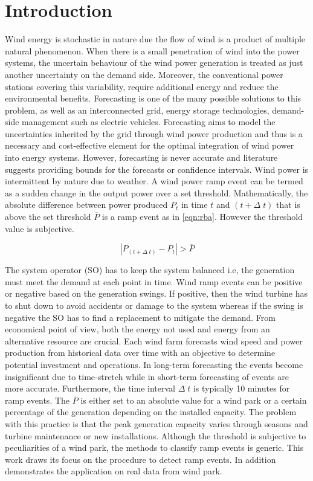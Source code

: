 \section{Introduction} \label{sec:intro}

Wind energy is stochastic in nature due the flow of wind is a product of multiple natural phenomenon. 
When there is a small penetration of wind into the power systems, the uncertain behaviour of the wind power generation is treated as just another uncertainty on the demand side. Moreover, the conventional power stations covering this variability, require additional energy and reduce the environmental benefits. Forecasting is one of the many possible solutions to this problem, as well as an interconnected grid, energy storage technologies, demand-side management such as electric vehicles. Forecasting aims to model the uncertainties inherited by the grid through wind power production and thus is a necessary and cost-effective element for the optimal integration of wind power into energy systems. However, forecasting is never accurate and literature suggests providing bounds for the forecasts or confidence intervals.
Wind power is intermittent by nature due to weather. A wind power ramp event can be termed as a sudden change in the output power over a set threshold. Mathematically, the absolute difference between power produced $P_t$ in time $t$ and $(t + \Delta \; t)$ that is above the set threshold $\overline{P}$ is a ramp event as in \eqref{eqn:rba}. However the threshold value is subjective. 

\begin{equation} \label{eqn:rba}
    | P_{(t + \Delta \; t)} - P_t | > \overline{P}
\end{equation}

\par
The system operator (SO) has to keep the system balanced i.e, the generation must meet the demand at each point in time. Wind ramp events can be positive or negative based on the generation swings. If positive, then the wind turbine has to shut down to avoid accidents or damage to the system whereas if the swing is negative the SO has to find a replacement to mitigate the demand. From economical point of view, both the energy not used and energy from an alternative resource are crucial. 
Each wind farm forecasts wind speed and power production from historical data over time with an objective to determine potential investment and operations. In long-term forecasting the events become insignificant due to time-stretch while in short-term forecasting of events are more accurate. Furthermore, the time interval $\Delta \; t$ is typically 10 minutes for ramp events. The $\overline{P}$ is either set to an absolute value for a wind park or a certain percentage of the generation depending on the installed capacity. The problem with this practice is that the peak generation capacity varies through seasons and turbine maintenance or new installations. Although the threshold is subjective to peculiarities of a wind park, the methods to classify ramp events is generic. This work draws its focus on the procedure to detect ramp events. In addition demonstrates the application on real data from wind park. 